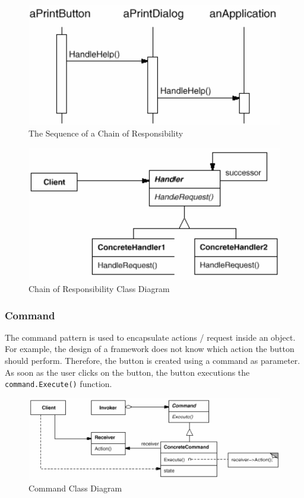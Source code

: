 \documentclass[11pt]{article}
\begin{document}
\begin{figure}[htbp]
\centering
\includegraphics[width=.9\linewidth]{img/chain_of_responsibility_sequence.png}
\caption{\label{fig:the-sequence-of-a-chain-of-responsibility}The Sequence of a Chain of Responsibility}
\end{figure}

\begin{figure}[htbp]
\centering
\includegraphics[width=.9\linewidth]{img/chain_of_responsibility.png}
\caption{\label{fig:chain-of-responsibility-class-diagram}Chain of Responsibility Class Diagram}
\end{figure}

\subsubsection{Command}
\label{sec:orgd5c8a07}
The command pattern is used to encapsulate actions / request inside an object.
For example, the design of a framework does not know which action the button should perform.
Therefore, the button is created using a command as parameter.
As soon as the user clicks on the button, the button executions the \texttt{command.Execute()} function.

\begin{figure}[htbp]
\centering
\includegraphics[width=.9\linewidth]{img/command.png}
\caption{\label{fig:command-class-diagram}Command Class Diagram}
\end{figure}
\end{document}
